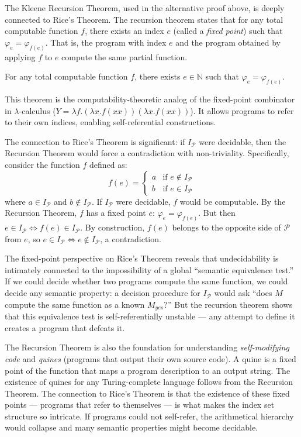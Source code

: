 The Kleene Recursion Theorem, used in the alternative proof above, is deeply connected to Rice's Theorem. The recursion theorem states that for any total computable function $f$, there exists an index $e$ (called a \emph{fixed point}) such that $\varphi_e = \varphi_{f(e)}$. That is, the program with index $e$ and the program obtained by applying $f$ to $e$ compute the same partial function.

\begin{theorem}
For any total computable function $f$, there exists $e \in \mathbb{N}$ such that $\varphi_e = \varphi_{f(e)}$.
\end{theorem}

This theorem is the computability-theoretic analog of the fixed-point combinator in $\lambda$-calculus ($Y = \lambda f. (\lambda x. f(xx))(\lambda x. f(xx))$). It allows programs to refer to their own indices, enabling self-referential constructions.

The connection to Rice's Theorem is significant: if $I_\mathcal{P}$ were decidable, then the Recursion Theorem would force a contradiction with non-triviality. Specifically, consider the function $f$ defined as:
\[
f(e) = \begin{cases}
a & \text{if } e \notin I_\mathcal{P} \\
b & \text{if } e \in I_\mathcal{P}
\end{cases}
\]
where $a \in I_\mathcal{P}$ and $b \notin I_\mathcal{P}$. If $I_\mathcal{P}$ were decidable, $f$ would be computable. By the Recursion Theorem, $f$ has a fixed point $e$: $\varphi_e = \varphi_{f(e)}$. But then $e \in I_\mathcal{P} \iff f(e) \in I_\mathcal{P}$. By construction, $f(e)$ belongs to the opposite side of $\mathcal{P}$ from $e$, so $e \in I_\mathcal{P} \iff e \notin I_\mathcal{P}$, a contradiction.

The fixed-point perspective on Rice's Theorem reveals that undecidability is intimately connected to the impossibility of a global ``semantic equivalence test.'' If we could decide whether two programs compute the same function, we could decide any semantic property: a decision procedure for $I_\mathcal{P}$ would ask ``does $M$ compute the same function as a known $M_{yes}$?'' But the recursion theorem shows that this equivalence test is self-referentially unstable --- any attempt to define it creates a program that defeats it.

The Recursion Theorem is also the foundation for understanding \emph{self-modifying code} and \emph{quines} (programs that output their own source code). A quine is a fixed point of the function that maps a program description to an output string. The existence of quines for any Turing-complete language follows from the Recursion Theorem. The connection to Rice's Theorem is that the existence of these fixed points --- programs that refer to themselves --- is what makes the index set structure so intricate. If programs could not self-refer, the arithmetical hierarchy would collapse and many semantic properties might become decidable.

